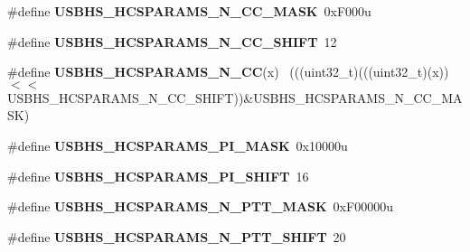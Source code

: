 \begin{DoxyCompactItemize}
\item 
\hypertarget{group___u_s_b_h_s___register___masks_gac4a98b27569d3e1862120dcb2de717b9}{}\#define {\bfseries U\+S\+B\+H\+S\+\_\+\+H\+C\+S\+P\+A\+R\+A\+M\+S\+\_\+\+N\+\_\+\+C\+C\+\_\+\+M\+A\+S\+K}~0x\+F000u\label{group___u_s_b_h_s___register___masks_gac4a98b27569d3e1862120dcb2de717b9}

\item 
\hypertarget{group___u_s_b_h_s___register___masks_gadb6e275e257c775d3d5e24d724625db6}{}\#define {\bfseries U\+S\+B\+H\+S\+\_\+\+H\+C\+S\+P\+A\+R\+A\+M\+S\+\_\+\+N\+\_\+\+C\+C\+\_\+\+S\+H\+I\+F\+T}~12\label{group___u_s_b_h_s___register___masks_gadb6e275e257c775d3d5e24d724625db6}

\item 
\hypertarget{group___u_s_b_h_s___register___masks_ga02ce04f460e5eaa3e293d30f5e3ed2b6}{}\#define {\bfseries U\+S\+B\+H\+S\+\_\+\+H\+C\+S\+P\+A\+R\+A\+M\+S\+\_\+\+N\+\_\+\+C\+C}(x)                                ~(((uint32\+\_\+t)(((uint32\+\_\+t)(x))$<$$<$U\+S\+B\+H\+S\+\_\+\+H\+C\+S\+P\+A\+R\+A\+M\+S\+\_\+\+N\+\_\+\+C\+C\+\_\+\+S\+H\+I\+F\+T))\&U\+S\+B\+H\+S\+\_\+\+H\+C\+S\+P\+A\+R\+A\+M\+S\+\_\+\+N\+\_\+\+C\+C\+\_\+\+M\+A\+S\+K)\label{group___u_s_b_h_s___register___masks_ga02ce04f460e5eaa3e293d30f5e3ed2b6}

\item 
\hypertarget{group___u_s_b_h_s___register___masks_gac921565027c57f9e4f4f1ed022d9cb32}{}\#define {\bfseries U\+S\+B\+H\+S\+\_\+\+H\+C\+S\+P\+A\+R\+A\+M\+S\+\_\+\+P\+I\+\_\+\+M\+A\+S\+K}~0x10000u\label{group___u_s_b_h_s___register___masks_gac921565027c57f9e4f4f1ed022d9cb32}

\item 
\hypertarget{group___u_s_b_h_s___register___masks_ga21ce9a2dbd2a2817cc16e2710baf12be}{}\#define {\bfseries U\+S\+B\+H\+S\+\_\+\+H\+C\+S\+P\+A\+R\+A\+M\+S\+\_\+\+P\+I\+\_\+\+S\+H\+I\+F\+T}~16\label{group___u_s_b_h_s___register___masks_ga21ce9a2dbd2a2817cc16e2710baf12be}

\item 
\hypertarget{group___u_s_b_h_s___register___masks_ga0712c15c654bccaeeee80c5927d88fb1}{}\#define {\bfseries U\+S\+B\+H\+S\+\_\+\+H\+C\+S\+P\+A\+R\+A\+M\+S\+\_\+\+N\+\_\+\+P\+T\+T\+\_\+\+M\+A\+S\+K}~0x\+F00000u\label{group___u_s_b_h_s___register___masks_ga0712c15c654bccaeeee80c5927d88fb1}

\item 
\hypertarget{group___u_s_b_h_s___register___masks_ga274561e1a73bee4699e5fcde8c933a2c}{}\#define {\bfseries U\+S\+B\+H\+S\+\_\+\+H\+C\+S\+P\+A\+R\+A\+M\+S\+\_\+\+N\+\_\+\+P\+T\+T\+\_\+\+S\+H\+I\+F\+T}~20\label{group___u_s_b_h_s___register___masks_ga274561e1a73bee4699e5fcde8c933a2c}


\end{DoxyCompactItemize}
